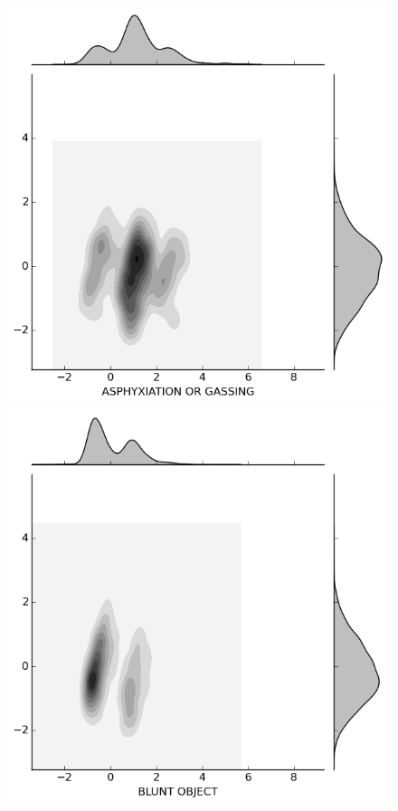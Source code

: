 \documentclass{evanarticle}
\begin{document}
\begin{figure}[H]

  \centering

  \begin{minipage}[b]{0.20\linewidth}
    \includegraphics[width=\linewidth]{images/weapon/ASPHYXIATION.png}
  \end{minipage}
  \quad
  \begin{minipage}[b]{0.20\linewidth}
    \includegraphics[width=\linewidth]{images/weapon/BLUNT_OBJECT.png}

\end{minipage}
\end{figure}
\end{document}
